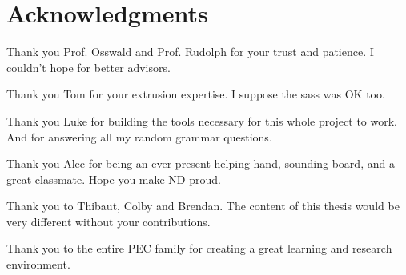 \documentclass[main.tex]{subfiles}
\begin{document}
\chapter*{Acknowledgments}
{
\setlength{\parindent}{0cm}
\setlength{\parskip}{12pt}
Thank you Prof. Osswald and Prof. Rudolph for your trust and patience. I couldn't hope for better advisors.
     
Thank you Tom for your extrusion expertise. I suppose the sass was OK too.

Thank you Luke for building the tools necessary for this whole project to work. And for answering all my random grammar questions.

Thank you Alec for being an ever-present helping hand, sounding board, and a great classmate. Hope you make ND proud.

Thank you to Thibaut, Colby and Brendan. The content of this thesis would be very different without your contributions.
    
Thank you to the entire PEC family for creating a great learning and research environment.

 
}
\end{document}
